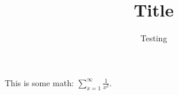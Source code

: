 \documentclass{article}
\title{Title}
\author{Testing}
\begin{document}
\maketitle

This is some math: $\sum_{x=1}^\infty \frac{1}{x^2}$.
\end{document}
